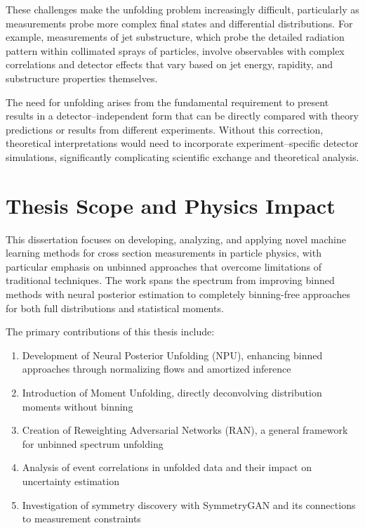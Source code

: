 These challenges make the unfolding problem increasingly difficult, particularly as measurements probe more complex final states and differential distributions.
%
For example, measurements of jet substructure, which probe the detailed radiation pattern within collimated sprays of particles, involve observables with complex correlations and detector effects that vary based on jet energy, rapidity, and substructure properties themselves. 

The need for unfolding arises from the fundamental requirement to present results in a detector--independent form that can be directly compared with theory predictions or results from different experiments. Without this correction, theoretical interpretations would need to incorporate experiment--specific detector simulations, significantly complicating scientific exchange and theoretical analysis.

\section{Thesis Scope and Physics Impact}

This dissertation focuses on developing, analyzing, and applying novel machine learning methods for cross section measurements in particle physics, with particular emphasis on unbinned approaches that overcome limitations of traditional techniques. The work spans the spectrum from improving binned methods with neural posterior estimation to completely binning-free approaches for both full distributions and statistical moments.

The primary contributions of this thesis include:

\begin{enumerate}
\item Development of Neural Posterior Unfolding (NPU), enhancing binned approaches through normalizing flows and amortized inference
\item Introduction of Moment Unfolding, directly deconvolving distribution moments without binning
\item Creation of Reweighting Adversarial Networks (RAN), a general framework for unbinned spectrum unfolding
\item Analysis of event correlations in unfolded data and their impact on uncertainty estimation
\item Investigation of symmetry discovery with SymmetryGAN and its connections to measurement constraints
\end{enumerate}

